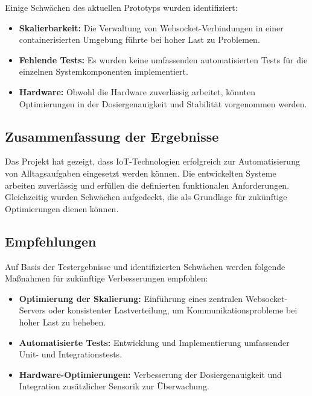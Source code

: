 Einige Schwächen des aktuellen Prototyps wurden identifiziert:
\begin{itemize}
  \item \textbf{Skalierbarkeit:} Die Verwaltung von Websocket-Verbindungen in einer 
  containerisierten Umgebung führte bei hoher Last zu Problemen.
  \item \textbf{Fehlende Tests:} Es wurden keine umfassenden automatisierten Tests für die einzelnen 
  Systemkomponenten implementiert.
  \item \textbf{Hardware:} Obwohl die Hardware zuverlässig arbeitet, könnten Optimierungen in der 
  Dosiergenauigkeit und Stabilität vorgenommen werden.
\end{itemize}

\subsection{Zusammenfassung der Ergebnisse}

Das Projekt hat gezeigt, dass IoT-Technologien erfolgreich zur Automatisierung von Alltagsaufgaben 
eingesetzt werden können. Die entwickelten Systeme arbeiten zuverlässig und erfüllen die definierten 
funktionalen Anforderungen. Gleichzeitig wurden Schwächen aufgedeckt, die als Grundlage für 
zukünftige Optimierungen dienen können.

\subsection{Empfehlungen}
Auf Basis der Testergebnisse und identifizierten Schwächen werden folgende Maßnahmen für zukünftige 
Verbesserungen empfohlen:
\begin{itemize}
  \item \textbf{Optimierung der Skalierung:} Einführung eines zentralen Websocket-Servers oder 
  konsistenter Lastverteilung, um Kommunikationsprobleme bei hoher Last zu beheben.
  \item \textbf{Automatisierte Tests:} Entwicklung und Implementierung umfassender \\
  Unit- und Integrationstests.
  \item \textbf{Hardware-Optimierungen:} Verbesserung der Dosiergenauigkeit und Integration 
  zusätzlicher Sensorik zur Überwachung.
\end{itemize}

